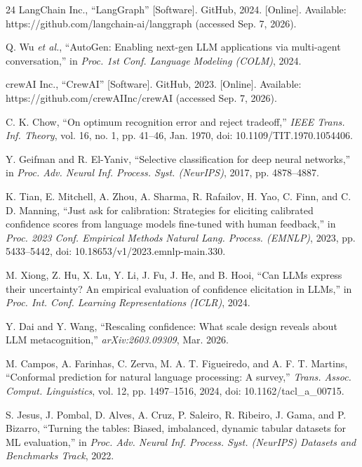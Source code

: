 \documentclass[]{ieeeaccess}
\begin{document}
\begin{thebibliography}{24}
LangChain Inc., ``LangGraph'' [Software]. GitHub, 2024. [Online].
Available: https://github.com/langchain-ai/langgraph (accessed Sep. 7,
2026).

Q. Wu \textit{et al.}, ``AutoGen: Enabling next-gen LLM applications via
multi-agent conversation,'' in \textit{Proc. 1st Conf. Language
Modeling (COLM)}, 2024.

crewAI Inc., ``CrewAI'' [Software]. GitHub, 2023. [Online]. Available:
https://github.com/crewAIInc/crewAI (accessed Sep. 7, 2026).

C. K. Chow, ``On optimum recognition error and reject tradeoff,''
\textit{IEEE Trans. Inf. Theory}, vol. 16, no. 1, pp. 41--46, Jan. 1970,
doi: 10.1109/TIT.1970.1054406.

Y. Geifman and R. El-Yaniv, ``Selective classification for deep neural
networks,'' in \textit{Proc. Adv. Neural Inf. Process. Syst. (NeurIPS)},
2017, pp. 4878--4887.

K. Tian, E. Mitchell, A. Zhou, A. Sharma, R. Rafailov, H. Yao, C. Finn,
and C. D. Manning, ``Just ask for calibration: Strategies for eliciting
calibrated confidence scores from language models fine-tuned with human
feedback,'' in \textit{Proc. 2023 Conf. Empirical Methods Natural Lang.
Process. (EMNLP)}, 2023, pp. 5433--5442, doi:
10.18653/v1/2023.emnlp-main.330.

M. Xiong, Z. Hu, X. Lu, Y. Li, J. Fu, J. He, and B. Hooi, ``Can LLMs
express their uncertainty? An empirical evaluation of confidence
elicitation in LLMs,'' in \textit{Proc. Int. Conf. Learning
Representations (ICLR)}, 2024.

Y. Dai and Y. Wang, ``Rescaling confidence: What scale design reveals
about LLM metacognition,'' \textit{arXiv:2603.09309}, Mar. 2026.

M. Campos, A. Farinhas, C. Zerva, M. A. T. Figueiredo, and A. F. T.
Martins, ``Conformal prediction for natural language processing: A
survey,'' \textit{Trans. Assoc. Comput. Linguistics}, vol. 12, pp.
1497--1516, 2024, doi: 10.1162/tacl\_a\_00715.

S. Jesus, J. Pombal, D. Alves, A. Cruz, P. Saleiro, R. Ribeiro, J. Gama,
and P. Bizarro, ``Turning the tables: Biased, imbalanced, dynamic
tabular datasets for ML evaluation,'' in \textit{Proc. Adv. Neural
Inf. Process. Syst. (NeurIPS) Datasets and Benchmarks Track}, 2022.


\end{thebibliography}
\end{document}

